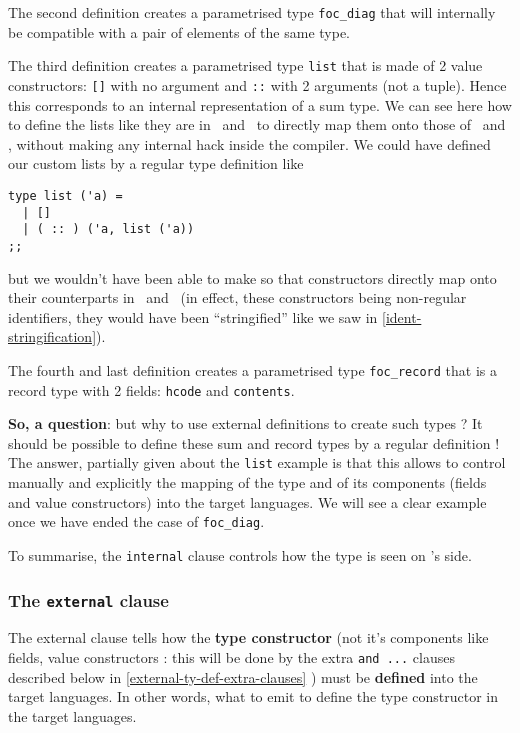 The second definition creates a parametrised type {\tt foc\_diag}
that will internally be compatible with a pair of elements of the same
type.

The third definition creates a parametrised type {\tt list} that is
made of 2 value constructors: {\tt []} with no argument and {\tt ::}
with 2 arguments (not a tuple). Hence this corresponds to an internal
representation of a sum type. We can see here how to define the lists
like they are in \coq\ and \ocaml\ to directly map them onto those of 
\coq\ and \ocaml, without making any internal hack inside the
compiler. We could have defined our custom lists by a regular type
definition like

{\footnotesize
\begin{lstlisting}
type list ('a) =
  | []
  | ( :: ) ('a, list ('a))
;;
\end{lstlisting}
}
but we wouldn't have been able to make so that constructors directly
map onto their counterparts in \coq\ and \ocaml\ (in effect, these
constructors being non-regular identifiers, they would have been
``stringified'' like we saw in \ref{ident-stringification}).

The fourth and last definition creates a parametrised type
{\tt foc\_record} that is a record type with 2 fields:
{\tt hcode} and {\tt contents}.

\medskip
{\bf So, a question}: but why to use external definitions to create
such types ? It should be possible to define these sum and record
types by a regular definition ! The answer, partially given about the
{\tt list} example is that this allows to control manually and
explicitly the mapping of the type and of its components (fields and
value constructors) into the target languages. We will see a clear
example once we have ended the case of {\tt foc\_diag}.

\medskip
To summarise, the {\tt internal} clause controls how the type is seen
on \focalize's side.


\subsubsection{The {\tt external} clause}
The external clause tells how the {\bf type constructor} (not it's
components like fields, value constructors : this will be done by the
extra {\tt and ...} clauses described below in
\ref{external-ty-def-extra-clauses} ) must be {\bf defined} into the
target languages. In other words, what to emit to define the type
constructor in the target languages.

